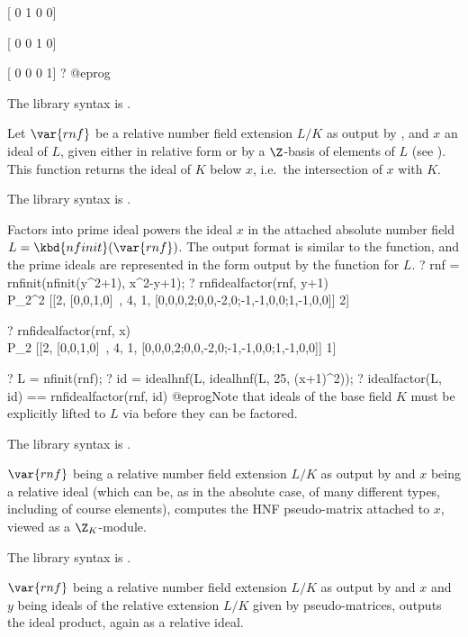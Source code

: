 [ 0 1 0 0]

[ 0 0 1 0]

[ 0 0 0 1]
? %
@eprog

The library syntax is .

\label{se:rnfidealdown}
Let $\var{rnf}$ be a relative number
field extension $L/K$ as output by , and $x$ an ideal of
$L$, given either in relative form or by a $\Z$-basis of elements of $L$
(see ). This function returns the ideal of $K$
below $x$, i.e.~the intersection of $x$ with $K$.

The library syntax is .

\label{se:rnfidealfactor}
Factors into prime ideal powers the
ideal $x$ in the attached absolute number field $L = \kbd{nfinit}(\var{rnf})$.
The output format is similar to the  function, and the prime
ideals are represented in the form output by the 
function for $L$.
\bprog
? rnf = rnfinit(nfinit(y^2+1), x^2-y+1);
? rnfidealfactor(rnf, y+1)  \\ P_2^2
[[2, [0,0,1,0]~, 4, 1, [0,0,0,2;0,0,-2,0;-1,-1,0,0;1,-1,0,0]] 2]

? rnfidealfactor(rnf, x) \\ P_2
[[2, [0,0,1,0]~, 4, 1, [0,0,0,2;0,0,-2,0;-1,-1,0,0;1,-1,0,0]] 1]

? L = nfinit(rnf);
? id = idealhnf(L, idealhnf(L, 25, (x+1)^2));
? idealfactor(L, id) == rnfidealfactor(rnf, id)
@eprog\noindent Note that ideals of the base field $K$ must be explicitly
lifted to $L$ via  before they can be factored.

The library syntax is .

\label{se:rnfidealhnf}
$\var{rnf}$ being a relative number
field extension $L/K$ as output by  and $x$ being a relative
ideal (which can be, as in the absolute case, of many different types,
including of course elements), computes the HNF pseudo-matrix attached to
$x$, viewed as a $\Z_K$-module.

The library syntax is .

\label{se:rnfidealmul}
$\var{rnf}$ being a relative number
field extension $L/K$ as output by  and $x$ and $y$ being ideals
of the relative extension $L/K$ given by pseudo-matrices, outputs the ideal
product, again as a relative ideal.

